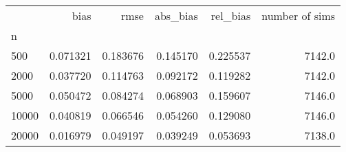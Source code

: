 \begin{tabular}{lrrrrr}
\toprule
{} &      bias &      rmse &  abs_bias &  rel_bias &  number of sims \\
n     &           &           &           &           &                 \\
\midrule
500   &  0.071321 &  0.183676 &  0.145170 &  0.225537 &          7142.0 \\
2000  &  0.037720 &  0.114763 &  0.092172 &  0.119282 &          7142.0 \\
5000  &  0.050472 &  0.084274 &  0.068903 &  0.159607 &          7146.0 \\
10000 &  0.040819 &  0.066546 &  0.054260 &  0.129080 &          7146.0 \\
20000 &  0.016979 &  0.049197 &  0.039249 &  0.053693 &          7138.0 \\
\bottomrule
\end{tabular}
